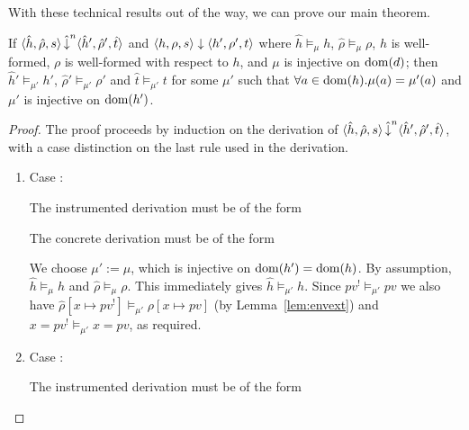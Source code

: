 \documentclass{article}
\begin{document}
With these technical results out of the way, we can prove our main theorem.

\begin{theorem}
If $\langle\hat{h},\hat{\rho},s\rangle\hatred{n}\langle\hat{h}',\hat{\rho}',\hat{t}\rangle$ and 
  $\langle h,\rho,s\rangle\red\langle h',\rho',t\rangle$ where 
  $\hat{h}\models_{\mu}h$, $\hat{\rho}\models_{\mu}\rho$,
  $h$ is well-formed, $\rho$ is well-formed with respect to $h$, and $\mu$ is injective on $\dom(d)$;
then 
  $\hat{h}'\models_{\mu'} h'$, $\hat{\rho}'\models_{\mu'}\rho'$ and $\hat{t}\models_{\mu'} t$ for some $\mu'$ such that $\forall a\in\dom(h).\mu(a)=\mu'(a)$ and $\mu'$ is injective on $\dom(h')$.
\end{theorem}
\begin{proof}
The proof proceeds by induction on the derivation of $\langle\hat{h},\hat{\rho},s\rangle\hatred{n}\langle\hat{h}',\hat{\rho}',\hat{t}\rangle$, with a case distinction on the last rule used in the derivation.
\begin{enumerate}
\item Case :

  The instrumented derivation must be of the form 

    \begin{prooftree}
    \end{prooftree}

  The concrete derivation must be of the form

    \begin{prooftree}
    \end{prooftree}

  We choose $\mu':=\mu$, which is injective on $\dom(h')=\dom(h)$. By assumption, $\hat{h}\models_{\mu}h$ and $\hat{\rho}\models_{\mu}\rho$. This immediately gives $\hat{h}\models_{\mu'}h$. Since $\mathit{pv}^!\models_{\mu'}\mathit{pv}$ we also have $\hat{\rho}[x\mapsto\mathit{pv}^!]\models_{\mu'}\rho[x\mapsto\mathit{pv}]$ (by Lemma~\ref{lem:envext}) and $x=\mathit{pv}^!\models_{\mu'}x=\mathit{pv}$, as required.
\item Case :

  The instrumented derivation must be of the form


\end{enumerate}
\end{proof}
\end{document}
